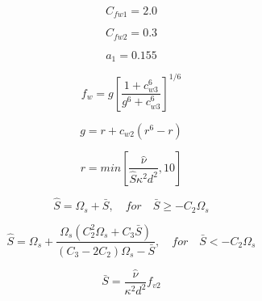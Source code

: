 {\newpage\clearpage
{}%
\begin{displaymath}
C_{fw1}=2.0
\end{displaymath}%
\lthtmldisplayZ
\lthtmlcheckvsize\clearpage}

{\newpage\clearpage
{}%
\begin{displaymath}
C_{fw2}=0.3
\end{displaymath}%
\lthtmldisplayZ
\lthtmlcheckvsize\clearpage}

{\newpage\clearpage
{}%
\begin{displaymath}
a_1 = 0.155
\end{displaymath}%
\lthtmldisplayZ
\lthtmlcheckvsize\clearpage}

{\newpage\clearpage
{}%
\begin{displaymath}
f_w = g \left[ \frac{1 + c_{w3}^6}{g^6 + c_{w3}^6} \right]^{1/6}
\end{displaymath}%
\lthtmldisplayZ
\lthtmlcheckvsize\clearpage}

{\newpage\clearpage
{}%
\begin{displaymath}
g = r + c_{w2}(r^6 - r)
\end{displaymath}%
\lthtmldisplayZ
\lthtmlcheckvsize\clearpage}

{\newpage\clearpage
{}%
\begin{displaymath}
r = min \left[ \frac{\hat \nu}{\hat S \kappa^2 d^2}, 10 \right]
\end{displaymath}%
\lthtmldisplayZ
\lthtmlcheckvsize\clearpage}

{\newpage\clearpage
{}%
\begin{displaymath}
\hat S = \Omega_s + \bar S, \quad for \quad \bar S \geq -C_2 \Omega_s
\end{displaymath}%
\lthtmldisplayZ
\lthtmlcheckvsize\clearpage}

{\newpage\clearpage
{}%
\begin{displaymath}
\hat S = \Omega_s + \frac{\Omega_s(C_2^2\Omega_s + C_3 \bar S)}{(C_3-2C_2)\Omega_s - \bar S}, \quad for \quad \bar S < -C_2 \Omega_s
\end{displaymath}%
\lthtmldisplayZ
\lthtmlcheckvsize\clearpage}

{\newpage\clearpage
{}%
\begin{displaymath}
\bar S = \frac{\hat \nu}{\kappa^2 d^2} f_{v2}
\end{displaymath}%
\lthtmldisplayZ
\lthtmlcheckvsize\clearpage}

